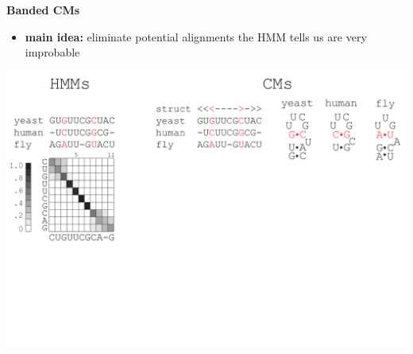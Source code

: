 \documentclass[landscape]{slides}
\begin{document}
\begin{slide}
\begin{center}
\large
\textbf{Banded CMs}
\end{center}
\medskip
\small
\begin{itemize}
\item
\textbf{main idea:} eliminate potential alignments the HMM tells us are very improbable
\end{itemize}
\begin{center}
\includegraphics[width=8in]{figs/post_hmm_to_cm_map2_layer1}
\end{center}
\vfill
\end{slide}
\end{document}
